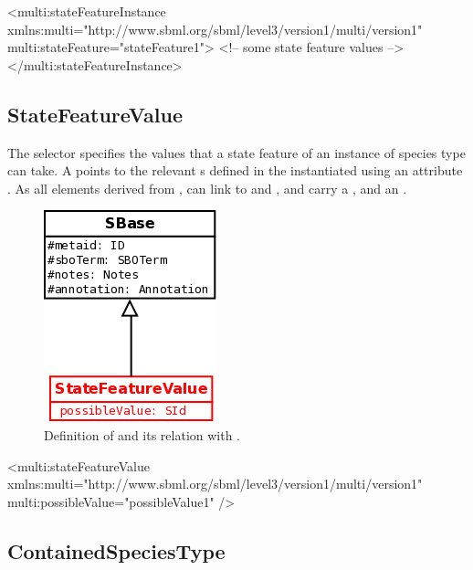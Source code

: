 \begin{example}
<multi:stateFeatureInstance 
                    xmlns:multi="http://www.sbml.org/sbml/level3/version1/multi/version1" 
                    multi:stateFeature="stateFeature1">
  <!-- some state feature values -->
</multi:stateFeatureInstance>
\end{example}

\subsection{StateFeatureValue}

The selector specifies the values that a state feature of an instance of species type can take. A   points to the relevant s defined in the instantiated  using an attribute . As all elements derived from ,  can link to  and , and carry a , and an .

\begin{figure}[H]
\begin{center}
\includegraphics[scale=0.3]{figs/pngs/StateFeatureValueClass.png} 
\caption{Definition of  and its relation with .}
\label{fig:StateFeatureValueClass}
\end{center}
\end{figure}

\begin{example}
<multi:stateFeatureValue 
                    xmlns:multi="http://www.sbml.org/sbml/level3/version1/multi/version1" 
                    multi:possibleValue="possibleValue1" />
\end{example}

\subsection{ContainedSpeciesType}

